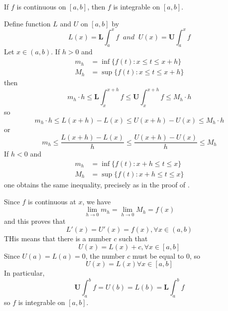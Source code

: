 \documentclass[12pt]{report}
\begin{document}
\begin{thm}{}{}
    If $f$ is continuous on $[a,b]$, then $f$ is integrable on $[a,b]$.
\end{thm}
\begin{proof*}{}{}
    Define function $L$ and $U$ on $[a,b]$ by \begin{equation*}
        L(x) = \mathbf{L}\int_a^xf\;\;and\;\;U(x) = \mathbf{U}\int_a^xf
    \end{equation*}
    Let $x \in (a,b)$. If $h > 0$ and \begin{align*}
        m_h &= \inf\{f(t):x\leq t \leq x+h\} \\
        M_h &= \sup\{f(t): x\leq t\leq x+h\} 
    \end{align*}
    then \begin{equation*}
        m_h\cdot h \leq \mathbf{L}\int_x^{x+h}f \leq \mathbf{U}\int_x^{x+h}f\leq M_h\cdot h
    \end{equation*}
    so \begin{equation*}
        m_h\cdot h \leq L(x+h) - L(x) \leq U(x+h) - U(x) \leq M_h\cdot h
    \end{equation*}
    or \begin{equation*}
        m_h\leq \frac{L(x+h)-L(x)}{h} \leq \frac{U(x+h)-U(x)}{h} \leq M_h
    \end{equation*}
    If $h < 0$ and \begin{align*}
        m_h &= \inf\{f(t):x+h\leq t \leq x\} \\
        M_h &= \sup\{f(t): x+h\leq t\leq x\} 
    \end{align*}
    one obtains the same inequality, precisely as in the proof of .

    Since $f$ is continuous at $x$, we have \begin{equation*}
        \lim\limits_{h\rightarrow 0}m_h = \lim\limits_{h\rightarrow 0}M_h = f(x)
    \end{equation*}
    and this proves that \begin{equation*}
        L'(x) = U'(x) = f(x),\forall x\in(a,b)
    \end{equation*}
    THis means that there is a number $c$ such that \begin{equation*}
        U(x) = L(x) + c,\forall x \in [a,b]
    \end{equation*}
    Since $U(a) = L(a) = 0$, the number $c$ must be equal to $0$, so \begin{equation*}
        U(x) = L(x) \forall x \in [a,b]
    \end{equation*}
    In particular, \begin{equation*}
        \mathbf{U}\int_a^bf = U(b) = L(b) = \mathbf{L}\int_a^bf
    \end{equation*}
    so $f$ is integrable on $[a,b]$.
\end{proof*}
\end{document}
